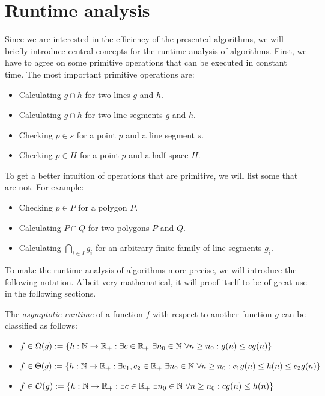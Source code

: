\section{Runtime analysis}
    Since we are interested in the efficiency of the presented algorithms, we will briefly introduce central concepts for the runtime analysis of algorithms. First, we have to agree on some primitive operations that can be executed in constant time. The most important primitive operations are:
    \begin{itemize}[itemsep=-3pt]
        \item Calculating $g \cap h$ for two lines $g$ and $h$.
        \item Calculating $g \cap h$ for two line segments $g$ and $h$.
        \item Checking $p \in s$ for a point $p$ and a line segment $s$.
        \item Checking $p \in H$ for a point $p$ and a half-space $H$.
    \end{itemize}
    To get a better intuition of operations that are primitive, we will list some that are not. For example: 
    \begin{itemize}[itemsep=-3pt]
        \item Checking $p \in P$ for a polygon $P$.
        \item Calculating $P \cap Q$ for two polygons $P$ and $Q$.
        \item Calculating $\bigcap_{i \in I} g_i$ for an arbitrary finite family of line segments $g_i$.
    \end{itemize}
    To make the runtime analysis of algorithms more precise, we will introduce the following notation. Albeit very mathematical, it will proof itself to be of great use in the following sections.

    \begin{definition}[$\LO$-calculus] 
        The \emph{asymptotic runtime} of a function $f$ with respect to another function $g$ can be classified as follows\footnotemark{}:
        \begin{itemize}[leftmargin=*]
            \item $f \in \Omega(g) := \{h: \mathbb{N} \to \mathbb{R}_+ : \exists c \in \mathbb{R}_+ \ \exists n_0 \in \mathbb{N} \ \forall n \geq n_0 : g(n) \leq c g(n)\}$
            
            \item $f \in \Theta(g) := \{h: \mathbb{N} \to \mathbb{R}_+ : \exists c_1, c_2 \in \mathbb{R}_+ \ \exists n_0 \in \mathbb{N} \ \forall n \geq n_0 : c_1 g(n) \leq h(n) \leq c_2 g(n)\}$
            
            \item $f \in \mathcal{O}(g) := \{h: \mathbb{N} \to \mathbb{R}_+ : \exists c \in \mathbb{R}_+ \ \exists n_0 \in \mathbb{N} \ \forall n \geq n_0 : c g(n) \leq h(n)\}$
        \end{itemize}
    \end{definition}
    
